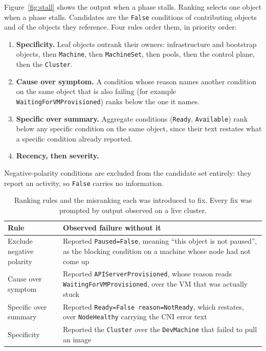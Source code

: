 \documentclass[conference]{IEEEtran}
\begin{document}
Figure~\ref{fig:stall} shows the output when a phase stalls.
Ranking selects one object when a phase stalls. Candidates are the \texttt{False}
conditions of contributing objects and of the objects they reference. Four rules
order them, in priority order:

\begin{enumerate}
\item \textbf{Specificity.} Leaf objects outrank their owners: infrastructure and
bootstrap objects, then \texttt{Machine}, then \texttt{MachineSet}, then pools,
then the control plane, then the \texttt{Cluster}.
\item \textbf{Cause over symptom.} A condition whose reason names another
condition on the same object that is also failing (for example
\texttt{WaitingForVMProvisioned}) ranks below the one it names.
\item \textbf{Specific over summary.} Aggregate conditions
(\texttt{Ready}, \texttt{Available}) rank below any specific condition on the same
object, since their text restates what a specific condition already reported.
\item \textbf{Recency, then severity.}
\end{enumerate}

Negative-polarity conditions are excluded from the candidate set entirely: they
report an activity, so \texttt{False} carries no information.

\begin{table}[t]
\caption{Ranking rules and the misranking each was introduced to fix. Every fix
was prompted by output observed on a live cluster.}
\label{tab:rank}
\centering
\footnotesize
\begin{tabular}{@{}p{}p{}@{}}
\toprule
Rule & Observed failure without it \\
\midrule
Exclude negative polarity & Reported \texttt{Paused=False}, meaning ``this object
is not paused'', as the blocking condition on a machine whose node had not come
up \\
Cause over symptom & Reported \texttt{APIServerProvisioned}, whose reason reads
\texttt{WaitingForVMProvisioned}, over the VM that was actually stuck \\
Specific over summary & Reported \texttt{Ready=False reason=NotReady}, which
restates, over \texttt{NodeHealthy} carrying the CNI error text \\
Specificity & Reported the \texttt{Cluster} over the \texttt{DevMachine} that
failed to pull an image \\
\bottomrule
\end{tabular}
\end{table}
\end{document}
